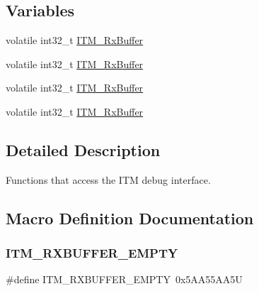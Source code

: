 \subsection*{Variables}
\begin{DoxyCompactItemize}
\item 
volatile int32\+\_\+t \mbox{\hyperlink{group___c_m_s_i_s__core___debug_functions_ga12e68e55a7badc271b948d6c7230b2a8}{I\+T\+M\+\_\+\+Rx\+Buffer}}
\item 
volatile int32\+\_\+t \mbox{\hyperlink{group___c_m_s_i_s__core___debug_functions_ga12e68e55a7badc271b948d6c7230b2a8}{I\+T\+M\+\_\+\+Rx\+Buffer}}
\item 
volatile int32\+\_\+t \mbox{\hyperlink{group___c_m_s_i_s__core___debug_functions_ga12e68e55a7badc271b948d6c7230b2a8}{I\+T\+M\+\_\+\+Rx\+Buffer}}
\item 
volatile int32\+\_\+t \mbox{\hyperlink{group___c_m_s_i_s__core___debug_functions_ga12e68e55a7badc271b948d6c7230b2a8}{I\+T\+M\+\_\+\+Rx\+Buffer}}
\end{DoxyCompactItemize}


\subsection{Detailed Description}
Functions that access the I\+TM debug interface. 



\subsection{Macro Definition Documentation}
\mbox{\label{group___c_m_s_i_s__core___debug_functions_gaa822cb398ee022b59e9e6c5d7bbb228a}} 
\subsubsection{\texorpdfstring{I\+T\+M\+\_\+\+R\+X\+B\+U\+F\+F\+E\+R\+\_\+\+E\+M\+P\+TY}{ITM\_RXBUFFER\_EMPTY}\hspace{0.1cm}{\footnotesize\ttfamily [1/4]}}
{\footnotesize\ttfamily \#define I\+T\+M\+\_\+\+R\+X\+B\+U\+F\+F\+E\+R\+\_\+\+E\+M\+P\+TY~0x5\+A\+A55\+A\+A5U}

